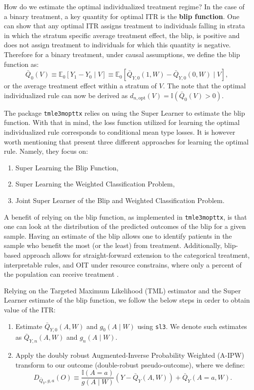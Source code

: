 \documentclass[
  12pt, krantz2,
]{krantz}
\newcommand{\passthrough}[1]{#1}
\providecommand{\tightlist}{%
  \setlength{\itemsep}{0pt}\setlength{\parskip}{0pt}}
\theoremstyle{definition}
\theoremstyle{definition}
\theoremstyle{definition}
\newcommand{\E}{\mathbb{E}}
\newcommand{\1}{\mathbbm{1}}
\begin{document}
How do we estimate the optimal individualized treatment regime? In the case of a
binary treatment, a key quantity for optimal ITR is the \textbf{blip function}. One can
show that any optimal ITR assigns treatment to individuals falling in strata in
which the stratum specific average treatment effect, the blip, is
positive and does not assign treatment to individuals for which this quantity is
negative. Therefore for a binary treatment, under causal assumptions, we define
the blip function as:
\[\bar{Q}_0(V) \equiv \E_0[Y_1-Y_0 \mid V] \equiv \E_0[\bar{Q}_{Y,0}(1,W) -
\bar{Q}_{Y,0}(0,W) \mid V],\]
or the average treatment effect within a stratum of \(V\). The note that the
optimal individualized rule can now be derived as \(d_{n,\text{opt}}(V) = \mathbb{I}(\bar{Q}_{0}(V) > 0)\).

The package \passthrough{\lstinline!tmle3mopttx!} relies on using the Super Learner to estimate the blip
function. With that in mind, the loss function utilized for learning the optimal
individualized rule corresponds to conditional mean type losses. It is however worth
mentioning that \citet{luedtke2016super} present three different approaches for learning the
optimal rule. Namely, they focus on:

\begin{enumerate}
\def\labelenumi{\arabic{enumi}.}
\item
  Super Learning the Blip Function,
\item
  Super Learning the Weighted Classification Problem,
\item
  Joint Super Learner of the Blip and Weighted Classification Problem.
\end{enumerate}

A benefit of relying on the blip function, as implemented in \passthrough{\lstinline!tmle3mopttx!}, is that
one can look at the distribution of the predicted outcomes of the blip for a given
sample. Having an estimate of the blip allows one to identify patients in the sample
who benefit the most (or the least) from treatment. Additionally, blip-based approach
allows for straight-forward extension to the categorical treatment, interpretable rules,
and OIT under resource constrains, where only a percent of the population can receive
treatment \citep{luedtke2016resource}.

Relying on the Targeted Maximum Likelihood (TML) estimator and the Super Learner
estimate of the blip function, we follow the below steps in order to obtain
value of the ITR:

\begin{enumerate}
\def\labelenumi{\arabic{enumi}.}
\tightlist
\item
  Estimate \(\bar{Q}_{Y,0}(A,W)\) and \(g_0(A \mid W)\) using \passthrough{\lstinline!sl3!}. We denote such
  estimates as \(\bar{Q}_{Y,n}(A,W)\) and \(g_n(A \mid W)\).
\item
  Apply the doubly robust Augmented-Inverse Probability Weighted (A-IPW)
  transform to our outcome (double-robust pseudo-outcome), where we define:
  \[D_{\bar{Q}_Y,g,a}(O) \equiv \frac{\mathbb{I}(A=a)}{g(A \mid W)} (Y -
  \bar{Q}_Y(A,W)) + \bar{Q}_Y(A=a,W).\]
\end{enumerate}
\end{document}
